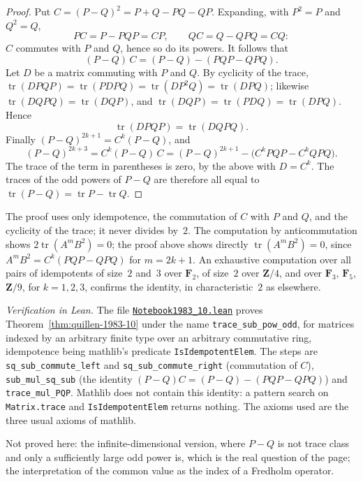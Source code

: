 \begin{proof}
Put $C = (P - Q)^2 = P + Q - PQ - QP$. Expanding, with $P^2 = P$ and $Q^2 = Q$,
\[
PC = P - PQP = CP, \qquad QC = Q - QPQ = CQ :
\]
$C$ commutes with $P$ and $Q$, hence so do its powers. It follows that
\[
(P - Q)\,C = (P - Q) - (PQP - QPQ).
\]
Let $D$ be a matrix commuting with $P$ and $Q$. By cyclicity of the trace, $\operatorname{tr}(DPQP) = \operatorname{tr}(PDPQ) = \operatorname{tr}(DP^2Q) = \operatorname{tr}(DPQ)$; likewise $\operatorname{tr}(DQPQ) = \operatorname{tr}(DQP)$, and $\operatorname{tr}(DQP) = \operatorname{tr}(PDQ) = \operatorname{tr}(DPQ)$. Hence
\[
\operatorname{tr}(DPQP) = \operatorname{tr}(DQPQ).
\]
Finally $(P - Q)^{2k+1} = C^k (P - Q)$, and
\[
(P - Q)^{2k+3} = C^k (P - Q)\, C = (P - Q)^{2k+1} - \bigl(C^k PQP - C^k QPQ\bigr).
\]
The trace of the term in parentheses is zero, by the above with $D = C^k$. The traces of the odd powers of $P - Q$ are therefore all equal to $\operatorname{tr}(P - Q) = \operatorname{tr} P - \operatorname{tr} Q$.
\end{proof}

\noindent The proof uses only idempotence, the commutation of $C$ with $P$ and $Q$, and the cyclicity of the trace; it never divides by~$2$. The computation by anticommutation shows $2\operatorname{tr}(A^m B^2) = 0$; the proof above shows directly $\operatorname{tr}(A^m B^2) = 0$, since $A^m B^2 = C^{k}(PQP - QPQ)$ for $m = 2k + 1$. An exhaustive computation over all pairs of idempotents of size~$2$ and~$3$ over $\mathbf F_2$, of size~$2$ over $\mathbf Z/4$, and over $\mathbf F_3$, $\mathbf F_5$, $\mathbf Z/9$, for $k = 1, 2, 3$, confirms the identity, in characteristic~$2$ as elsewhere.

\emph{Verification in Lean.} The file \href{\leanblobmain/Notebook1983_10.lean}{\texttt{Notebook1983\_10.\allowbreak{}lean}} proves Theorem~\ref{thm:quillen-1983-10} under the name \texttt{trace\_sub\_pow\_odd}, for matrices indexed by an arbitrary finite type over an arbitrary commutative ring, idempotence being mathlib's predicate \texttt{IsIdempotentElem}. The steps are \texttt{sq\_sub\_commute\_left} and \texttt{sq\_sub\_commute\_right} (commutation of $C$), \texttt{sub\_mul\_sq\_sub} (the identity $(P - Q)C = (P - Q) - (PQP - QPQ)$) and \texttt{trace\_mul\_PQP}. Mathlib does not contain this identity: a pattern search on \texttt{Matrix.trace} and \texttt{IsIdempotentElem} returns nothing. The axioms used are the three usual axioms of mathlib.

Not proved here: the infinite-dimensional version, where $P - Q$ is not trace class and only a sufficiently large odd power is, which is the real question of the page; the interpretation of the common value as the index of a Fredholm operator.

